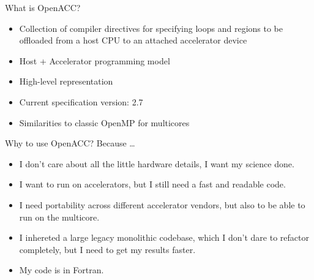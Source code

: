 \documentclass[12pt,aspectratio=169]{beamer}
\begin{document}
\begin{frame}{What is OpenACC?}
  \begin{itemize}
  \item Collection of compiler directives for specifying loops and regions to be
    offloaded from a host CPU to an attached accelerator device
  \item Host + Accelerator programming model
  \item High-level representation
  \item Current specification version: 2.7
  \item Similarities to classic OpenMP for multicores
  \end{itemize}
\end{frame}

\begin{frame}{Why to use OpenACC?}
  Because \dots
  \vspace\baselineskip
  \begin{itemize}
  \item I don't care about all the little hardware details, I want my science done.
  \item I want to run on accelerators, but I still need a fast and readable code.
  \item I need portability across different accelerator vendors, but also to be able to run on the multicore.
  \item I inhereted a large legacy monolithic codebase, which I don't dare to
    refactor completely, but I need to get my results faster.
  \item My code is in Fortran.
  \end{itemize}
\end{frame}
\end{document}
